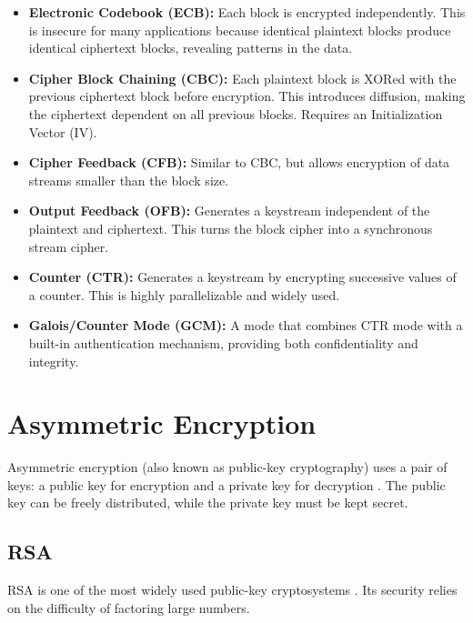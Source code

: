 \documentclass{report}
\begin{document}
\begin{itemize}
    \item \textbf{Electronic Codebook (ECB):} Each block is encrypted independently.  This is insecure for many applications because identical plaintext blocks produce identical ciphertext blocks, revealing patterns in the data.
    \item \textbf{Cipher Block Chaining (CBC):} Each plaintext block is XORed with the previous ciphertext block before encryption.  This introduces diffusion, making the ciphertext dependent on all previous blocks.  Requires an Initialization Vector (IV).
    \item \textbf{Cipher Feedback (CFB):} Similar to CBC, but allows encryption of data streams smaller than the block size.
    \item \textbf{Output Feedback (OFB):}  Generates a keystream independent of the plaintext and ciphertext.  This turns the block cipher into a synchronous stream cipher.
    \item \textbf{Counter (CTR):}  Generates a keystream by encrypting successive values of a counter.  This is highly parallelizable and widely used.
    \item \textbf{Galois/Counter Mode (GCM):}  A mode that combines CTR mode with a built-in authentication mechanism, providing both confidentiality and integrity.
\end{itemize}

\section{Asymmetric Encryption}
\label{sec:asymmetric-encryption}

Asymmetric encryption (also known as public-key cryptography) uses a pair of keys: a public key for encryption and a private key for decryption \cite{diffie_hellman}.  The public key can be freely distributed, while the private key must be kept secret.

\subsection{RSA}
\label{subsec:rsa}

RSA is one of the most widely used public-key cryptosystems \cite{rivest}.  Its security relies on the difficulty of factoring large numbers.
\end{document}
